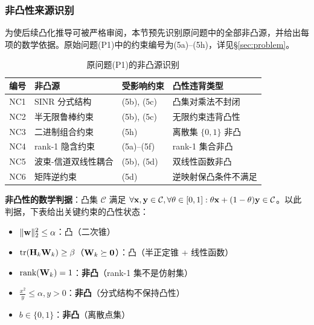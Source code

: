 \subsubsection{非凸性来源识别}

为使后续凸化推导可被严格审阅，本节预先识别原问题中的全部非凸源，并给出每项的数学依据。原始问题(P1)中的约束编号为(5a)--(5h)，详见§\ref{sec:problem}。

\begin{table}[htbp]
\centering
\caption{原问题(P1)的非凸源识别}\label{tab:nonconvex_sources}
\begin{tabular}{clll}
\toprule
编号 & 非凸源 & 受影响约束 & 凸性违背类型 \\
\midrule
NC1 & SINR 分式结构 & (5b), (5c) & 凸集对乘法不封闭 \\
NC2 & 半无限鲁棒约束 & (5b), (5c) & 无限约束违背凸性 \\
NC3 & 二进制组合约束 & (5h) & 离散集 $\{0,1\}$ 非凸 \\
NC4 & rank-1 隐含约束 & (5a)--(5f) & rank-1 集合非凸 \\
NC5 & 波束-信道双线性耦合 & (5b), (5d) & 双线性函数非凸 \\
NC6 & 矩阵逆约束 & (5d) & 逆映射保凸条件不满足 \\
\bottomrule
\end{tabular}
\end{table}

\textbf{非凸性的数学判据}：凸集 $\mathcal{C}$ 满足 $\forall \mathbf{x},\mathbf{y}\in\mathcal{C},\forall \theta\in[0,1]: \theta\mathbf{x}+(1-\theta)\mathbf{y}\in\mathcal{C}$。以此判据，下表给出关键约束的凸性状态：

\begin{itemize}
    \item $\|\mathbf{w}\|_2^2 \leq \alpha$：凸（二次锥）
    \item $\text{tr}(\mathbf{H}_k \mathbf{W}_k) \geq \beta$（$\mathbf{W}_k \succeq \mathbf{0}$）：凸（半正定锥 + 线性函数）
    \item $\text{rank}(\mathbf{W}_k) = 1$：\textbf{非凸}（rank-1 集不是仿射集）
    \item $\frac{x^2}{y} \leq \alpha, y > 0$：\textbf{非凸}（分式结构不保持凸性）
    \item $b \in \{0,1\}$：\textbf{非凸}（离散点集）
\end{itemize}

